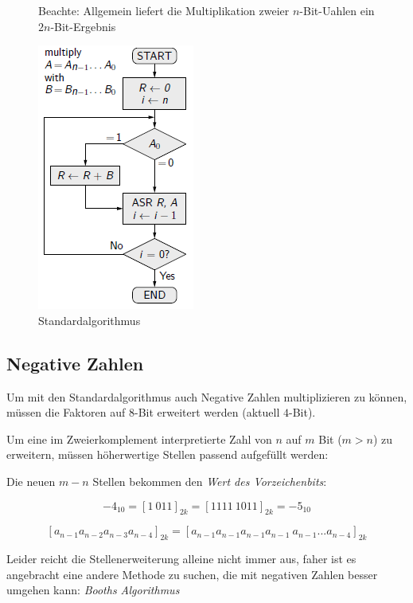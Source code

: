 \documentclass[12pt]{report}
\begin{document}
\begin{figure}[H]
\begin{minipage}[t]{0.45\textwidth}
    \par Beachte: Allgemein liefert die Multiplikation zweier $n$-Bit-Uahlen ein $2n$-Bit-Ergebnis
  \end{minipage}
  \hfill
  \begin{minipage}[t]{0.45\textwidth}
    \caption{Standardalgorithmus}
    \label{fig:standard-multiplikationsalgorithmus}
    \centering
    \includegraphics{standard-multiplikationsalgorithmus}
  \end{minipage}
\end{figure}

\subsection{Negative Zahlen}
Um mit den Standardalgorithmus auch Negative Zahlen multiplizieren zu können, müssen die
Faktoren auf $8$-Bit erweitert werden (aktuell $4$-Bit).

Um eine im Zweierkomplement interpretierte Zahl von $n$ auf $m$ Bit ($m>n$) zu erweitern,
müssen höherwertige Stellen passend aufgefüllt werden:

Die neuen $m-n$ Stellen bekommen den \textit{Wert des Vorzeichenbits}:

$$-4_{10} = [1\ 011]_{2k} = [1111\ 1011]_{2k} = -5_{10}$$

$$[a_{n-1} a_{n-2} a_{n-3} a_{n-4}]_{2k} = [a_{n-1} a_{n-1} a_{n-1} a_{n-1}\ a_{n-1} ... a_{n-4}]_{2k}$$

Leider reicht die Stellenerweiterung alleine nicht immer aus, faher ist es angebracht eine andere Methode zu suchen,
die mit negativen Zahlen besser umgehen kann: \textit{Booths Algorithmus}
\end{document}

